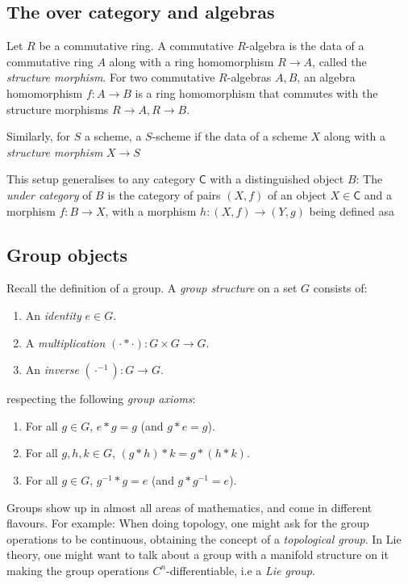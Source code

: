 \documentclass{article}
\begin{document}
\subsection{The over category and algebras}


Let $R$ be a commutative ring.
A commutative $R$-algebra is the data of a commutative ring $A$ along with a ring homomorphism
$R \to A$, called the \emph{structure morphism}.
For two commutative $R$-algebras $A, B$,
an algebra homomorphism $f : A \to B$ is a ring homomorphism that commutes
with the structure morphisms $R \to A, R \to B$.

Similarly, for $S$ a scheme, a $S$-scheme if the data of a scheme $X$ along with a
\emph{structure morphism} $X \to S$

This setup generalises to any category $\mathsf C$ with a distinguished object $B$:
The \emph{under category} of $B$ is the category of pairs $(X, f)$ of an object $X \in \mathsf C$
and a morphism $f : B \to X$, with a morphism $h : (X, f) \to (Y, g)$ being defined asa



\subsection{Group objects}


Recall the definition of a group. A \emph{group structure} on a set $G$ consists of:
\begin{enumerate}
  \item An \emph{identity} $e \in G$.
  \item A \emph{multiplication} $(\cdot * \cdot) : G \times G \to G$.
  \item An \emph{inverse} $(\cdot^{-1}) : G \to G$.
\end{enumerate}

respecting the following \emph{group axioms}:
\begin{enumerate}
  \item For all $g \in G$, $e * g = g$ (and $g * e = g$).
  \item For all $g, h, k \in G$, $(g * h) * k = g * (h * k)$.
  \item For all $g \in G$, $g^{-1} * g = e$ (and $g * g^{-1} = e$).
\end{enumerate}

Groups show up in almost all areas of mathematics, and come in different flavours. For example:
When doing topology, one might ask for the group operations to be continuous,
obtaining the concept of a \emph{topological group}.
In Lie theory, one might want to talk about a group with a manifold structure on it
making the group operations $C^n$-differentiable, i.e a \emph{Lie group}.
\end{document}
